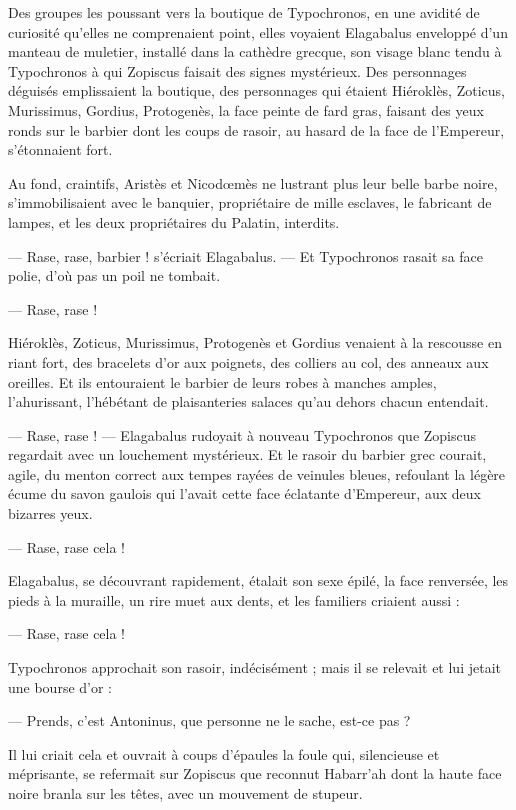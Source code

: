 \documentclass[a4paper, 11pt, oneside, polutonikogreek, french]{article}
\begin{document}
Des groupes les poussant vers la boutique de Typochronos, en une avidité de curiosité qu'elles ne comprenaient point, elles voyaient Elagabalus enveloppé d'un manteau de muletier, installé dans la cathèdre grecque, son visage blanc tendu à Typochronos à qui Zopiscus faisait des signes mystérieux. Des personnages déguisés emplissaient la boutique, des personnages qui étaient Hiéroklès, Zoticus, Murissimus, Gordius, Protogenès, la face peinte de fard gras, faisant des yeux ronds sur le barbier dont les coups de rasoir, au hasard de la face de l'Empereur, s'étonnaient fort.

Au fond, craintifs, Aristès et Nicodœmès ne lustrant plus leur belle barbe noire, s'immobilisaient avec le banquier, propriétaire de mille esclaves, le fabricant de lampes, et les deux propriétaires du Palatin, interdits.

--- Rase, rase, barbier ! s'écriait Elagabalus. --- Et Typochronos rasait sa face polie, d'où pas un poil ne tombait.

--- Rase, rase !

Hiéroklès, Zoticus, Murissimus, Protogenès et Gordius venaient à la rescousse en riant fort, des bracelets d'or aux poignets, des colliers au col, des anneaux aux oreilles. Et ils entouraient le barbier de leurs robes à manches amples, l'ahurissant, l'hébétant de plaisanteries salaces qu'au dehors chacun entendait.

--- Rase, rase ! --- Elagabalus rudoyait à nouveau Typochronos que Zopiscus regardait avec un louchement mystérieux. Et le rasoir du barbier grec courait, agile, du menton correct aux tempes rayées de veinules bleues, refoulant la légère écume du savon gaulois qui l’avait cette face éclatante d'Empereur, aux deux bizarres yeux.

--- Rase, rase cela !

Elagabalus, se découvrant rapidement, étalait son sexe épilé, la face renversée, les pieds à la muraille, un rire muet aux dents, et les familiers criaient aussi :

--- Rase, rase cela !

Typochronos approchait son rasoir, indécisément ; mais il se relevait et lui jetait une bourse d'or :

--- Prends, c'est Antoninus, que personne ne le sache, est-ce pas ?

Il lui criait cela et ouvrait à coups d'épaules la foule qui, silencieuse et méprisante, se refermait sur Zopiscus que reconnut Habarr'ah dont la haute face noire branla sur les têtes, avec un mouvement de stupeur.
\end{document}
